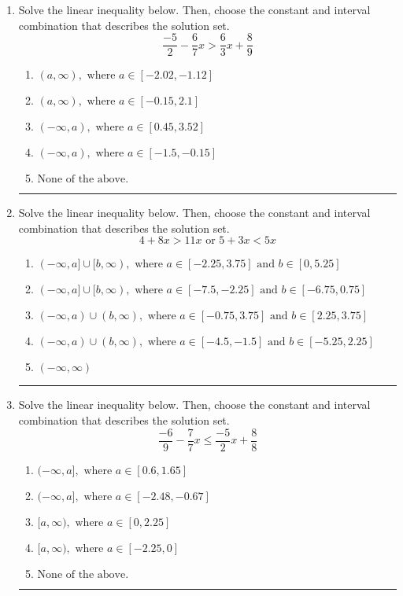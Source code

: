 \documentclass[14pt]{extbook}
\newcommand{\litem}[1]{\item#1\hspace*{-1cm}\rule{\textwidth}{0.4pt}}
\begin{document}
\begin{enumerate}
{\begin{enumerate}[label=\Alph*.]
\end{enumerate} }
\litem{
Solve the linear inequality below. Then, choose the constant and interval combination that describes the solution set.\[ \frac{-5}{2} - \frac{6}{7} x > \frac{6}{3} x + \frac{8}{9} \]\begin{enumerate}[label=\Alph*.]
\item \( (a, \infty), \text{ where } a \in [-2.02, -1.12] \)
\item \( (a, \infty), \text{ where } a \in [-0.15, 2.1] \)
\item \( (-\infty, a), \text{ where } a \in [0.45, 3.52] \)
\item \( (-\infty, a), \text{ where } a \in [-1.5, -0.15] \)
\item \( \text{None of the above}. \)

\end{enumerate} }
\litem{
Solve the linear inequality below. Then, choose the constant and interval combination that describes the solution set.\[ 4 + 8 x > 11 x \text{ or } 5 + 3 x < 5 x \]\begin{enumerate}[label=\Alph*.]
\item \( (-\infty, a] \cup [b, \infty), \text{ where } a \in [-2.25, 3.75] \text{ and } b \in [0, 5.25] \)
\item \( (-\infty, a] \cup [b, \infty), \text{ where } a \in [-7.5, -2.25] \text{ and } b \in [-6.75, 0.75] \)
\item \( (-\infty, a) \cup (b, \infty), \text{ where } a \in [-0.75, 3.75] \text{ and } b \in [2.25, 3.75] \)
\item \( (-\infty, a) \cup (b, \infty), \text{ where } a \in [-4.5, -1.5] \text{ and } b \in [-5.25, 2.25] \)
\item \( (-\infty, \infty) \)

\end{enumerate} }
\litem{
Solve the linear inequality below. Then, choose the constant and interval combination that describes the solution set.\[ \frac{-6}{9} - \frac{7}{7} x \leq \frac{-5}{2} x + \frac{8}{8} \]\begin{enumerate}[label=\Alph*.]
\item \( (-\infty, a], \text{ where } a \in [0.6, 1.65] \)
\item \( (-\infty, a], \text{ where } a \in [-2.48, -0.67] \)
\item \( [a, \infty), \text{ where } a \in [0, 2.25] \)
\item \( [a, \infty), \text{ where } a \in [-2.25, 0] \)
\item \( \text{None of the above}. \)


\end{enumerate}}
\end{enumerate}
\end{document}
